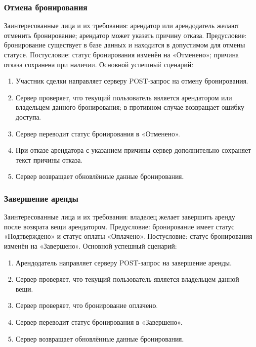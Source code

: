 \subsubsection{Отмена бронирования}
Заинтересованные лица и их требования: арендатор или арендодатель желают отменить бронирование; арендатор может указать причину отказа.
Предусловие: бронирование существует в базе данных и находится в допустимом для отмены статусе.
Постусловие: статус бронирования изменён на «Отменено»; причина отказа сохранена при наличии.
Основной успешный сценарий:
\begin{enumerate}
\item Участник сделки направляет серверу POST-запрос на отмену бронирования.
\item Сервер проверяет, что текущий пользователь является арендатором или владельцем данного бронирования; в противном случае возвращает ошибку доступа.
\item Сервер переводит статус бронирования в «Отменено».
\item При отказе арендатора с указанием причины сервер дополнительно сохраняет текст причины отказа.
\item Сервер возвращает обновлённые данные бронирования.
\end{enumerate}

\subsubsection{Завершение аренды}
Заинтересованные лица и их требования: владелец желает завершить аренду после возврата вещи арендатором.
Предусловие: бронирование имеет статус «Подтверждено» и статус оплаты «Оплачено».
Постусловие: статус бронирования изменён на «Завершено».
Основной успешный сценарий:
\begin{enumerate}
\item Арендодатель направляет серверу POST-запрос на завершение аренды.
\item Сервер проверяет, что текущий пользователь является владельцем данной вещи.
\item Сервер проверяет, что бронирование оплачено.
\item Сервер переводит статус бронирования в «Завершено».
\item Сервер возвращает обновлённые данные бронирования.
\end{enumerate}

